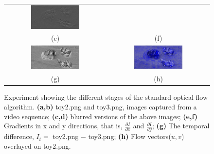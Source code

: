 \documentclass[11pt]{article}
\begin{document}
\begin{figure}[!hbt]
\begin{tabular}{cc}
  \includegraphics[width=0.5\textwidth]{../Ey2-9.png} \\
  (e) & (f)  \\
  \includegraphics[width=0.5\textwidth]{../Et2-9.png} &
  \includegraphics[width=0.5\textwidth]{../car2-9_lk.png} \\
  (g) & (h) \\
 \end{tabular}
 \vspace{-10pt}
 \caption{ Experiment showing the different stages of the standard optical flow algorithm. {\bf (a,b)} toy2.png and toy3.png, images captured from a video sequence; {\bf (c,d)} blurred versions of the above images; {\bf (e,f)} Gradients in x and y directions, that is, $\frac{\partial I}{\partial x}$ and $\frac{\partial I}{\partial y}$; {\bf (g)} The temporal difference, $I_t = $ toy2.png $-$ toy3.png; {\bf (h)} Flow vectors($u,v$) overlayed on toy2.png.}
 \label{fig7}
\end{figure}
\end{document}
